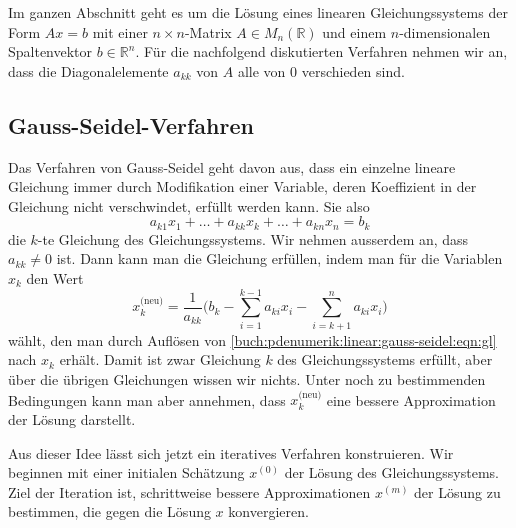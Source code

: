 Im ganzen Abschnitt geht es um die Lösung eines linearen Gleichungssystems
der Form $Ax=b$ mit einer $n\times n$-Matrix $A\in M_n(\mathbb{R})$ und
einem $n$-dimensionalen Spaltenvektor $b\in\mathbb{R}^n$.
Für die nachfolgend diskutierten Verfahren nehmen wir an, dass die
Diagonalelemente $a_{kk}$ von $A$ alle von $0$ verschieden sind.

%
%
\subsection{Gauss-Seidel-Verfahren
\label{buch:pdenumerik:linear:subsection:gauss-seidel}}
Das Verfahren von Gauss-Seidel geht davon aus, dass ein einzelne lineare
%
Gleichung immer durch Modifikation einer Variable, deren Koeffizient in
der Gleichung nicht verschwindet, erfüllt werden kann.
Sie also
\begin{equation}
a_{k1}x_1 + \dots + a_{kk}x_k + \dots + a_{kn}x_n = b_k
\label{buch:pdenumerik:linear:gauss-seidel:eqn:gl}
\end{equation}
die $k$-te Gleichung des Gleichungssystems.
Wir nehmen ausserdem an, dass $a_{kk}\ne 0$ ist.
Dann kann man die Gleichung erfüllen, indem man für die Variablen $x_k$
den Wert
\begin{equation}
x_k^{\text{(neu)}}
=
\frac{1}{a_{kk}}
\biggl(
b_k
-
\sum_{i=1}^{k-1}a_{ki}x_i
-
\sum_{i=k+1}^na_{ki}x_i
\biggr)
\label{buch:pdenumerik:linear:gauss-seidel:eqn:schritt}
\end{equation}
wählt, den man durch Auflösen von
\eqref{buch:pdenumerik:linear:gauss-seidel:eqn:gl}
nach $x_k$ erhält.
Damit ist zwar Gleichung $k$ des Gleichungssystems erfüllt, aber über die
übrigen Gleichungen wissen wir nichts.
Unter noch zu bestimmenden Bedingungen kann man aber annehmen, dass 
$x_k^{\text{(neu)}}$ eine bessere Approximation der Lösung darstellt.

Aus dieser Idee lässt sich jetzt ein iteratives Verfahren konstruieren.
Wir beginnen mit einer initialen Schätzung $x^{(0)}$ der Lösung des
Gleichungssystems.
Ziel der Iteration ist, schrittweise bessere Approximationen $x^{(m)}$
der Lösung zu bestimmen, die gegen die Lösung $x$ konvergieren.

